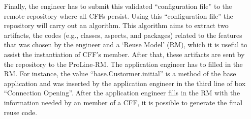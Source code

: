 Finally, the engineer has to submit this validated ``configuration file'' to the remote repository where all CFFs persist. Using this ``configuration file'' the repository will carry out an algorithm. This algorithm aims to extract two artifacts, the codes (e.g., classes, aspects, and packages) related to the features that was chosen by the engineer and a `Reuse Model' (RM), which it is useful to assist the instantiation of CFF's member. After that, these artifacts are sent by the repository to the ProLine-RM. %
The application engineer has to filled in the RM. For instance, the value ``base.Custormer.initial'' is a method of the base application and was inserted by the application engineer in the third line of box ``Connection Opening''. After the application engineer fills in the RM with the information needed by an member of a CFF, it is possible to generate the final reuse code.

     
